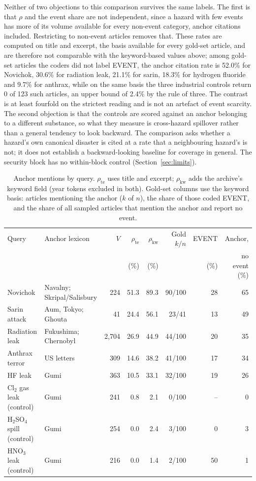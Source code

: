 \documentclass[1p,times]{elsarticle}
\begin{document}
Neither of two objections to this comparison survives the same labels. The first is that $\rho$ and the event share are not independent, since a hazard with few events has more of its volume available for every non-event category, anchor citations included. Restricting to non-event articles removes that. These rates are computed on title and excerpt, the basis available for every gold-set article, and are therefore not comparable with the keyword-based values above; among gold-set articles the coders did not label EVENT, the anchor citation rate is 52.0\% for Novichok, 30.6\% for radiation leak, 21.1\% for sarin, 18.3\% for hydrogen fluoride and 9.7\% for anthrax, while on the same basis the three industrial controls return 0 of 123 such articles, an upper bound of 2.4\% by the rule of three. The contrast is at least fourfold on the strictest reading and is not an artefact of event scarcity. The second objection is that the controls are scored against an anchor belonging to a different substance, so what they measure is cross-hazard spillover rather than a general tendency to look backward. The comparison asks whether a hazard's own canonical disaster is cited at a rate that a neighbouring hazard's is not; it does not establish a backward-looking baseline for coverage in general. The security block has no within-block control (Section~\ref{sec:limits}).

\begin{table}[!htb]
\centering\small
\caption{Anchor mentions by query. $\rho_{\mathrm{te}}$ uses title and excerpt; $\rho_{\mathrm{kw}}$ adds the archive's keyword field (year tokens excluded in both). Gold-set columns use the keyword basis: articles mentioning the anchor ($k$ of $n$), the share of those coded EVENT, and the share of all sampled articles that mention the anchor and report no event.}
\label{tab:anchor}
\setlength{\tabcolsep}{3pt}
\begin{tabular*}{\textwidth}{@{\extracolsep{\fill}}llrrrrrr@{}}
\toprule
Query & Anchor lexicon & $V$ & $\rho_{\mathrm{te}}$ & $\rho_{\mathrm{kw}}$ & Gold $k/n$ & EVENT & Anchor, \\
 & & & (\%) & (\%) & & (\%) & no event (\%) \\
\midrule
Novichok & Navalny; Skripal/Salisbury & 224 & 51.3 & 89.3 & 90/100 & 28 & 65 \\
Sarin attack & Aum, Tokyo; Ghouta & 41 & 24.4 & 56.1 & 23/41 & 13 & 49 \\
Radiation leak & Fukushima; Chernobyl & 2,704 & 26.9 & 44.9 & 44/100 & 20 & 35 \\
Anthrax terror & US letters & 309 & 14.6 & 38.2 & 41/100 & 17 & 34 \\
HF leak & Gumi & 363 & 10.5 & 33.1 & 32/100 & 19 & 26 \\
Cl$_2$ gas leak (control) & Gumi & 241 & 0.8 & 2.1 & 0/100 & -- & 0 \\
H$_2$SO$_4$ spill (control) & Gumi & 254 & 0.0 & 2.4 & 3/100 & 0 & 3 \\
HNO$_3$ leak (control) & Gumi & 216 & 0.0 & 1.4 & 2/100 & 50 & 1 \\
\bottomrule
\end{tabular*}
\end{table}
\end{document}
